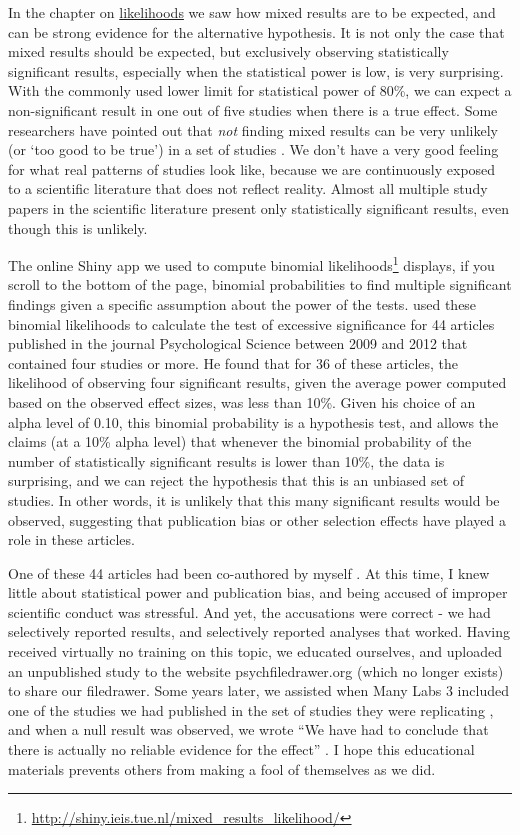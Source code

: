 \documentclass[
  oneside]{krantz}
\renewcommand{\href}[2]{#2\footnote{\url{#1}}}
\begin{document}
In the chapter on \protect\hyperlink{likelihoods}{likelihoods} we saw how mixed results are to be expected, and can be strong evidence for the alternative hypothesis. It is not only the case that mixed results should be expected, but exclusively observing statistically significant results, especially when the statistical power is low, is very surprising. With the commonly used lower limit for statistical power of 80\%, we can expect a non-significant result in one out of five studies when there is a true effect. Some researchers have pointed out that \emph{not} finding mixed results can be very unlikely (or `too good to be true') in a set of studies \citep{francis_frequency_2014, schimmack_ironic_2012}. We don't have a very good feeling for what real patterns of studies look like, because we are continuously exposed to a scientific literature that does not reflect reality. Almost all multiple study papers in the scientific literature present only statistically significant results, even though this is unlikely.

The \href{http://shiny.ieis.tue.nl/mixed_results_likelihood/}{online Shiny app we used to compute binomial likelihoods} displays, if you scroll to the bottom of the page, binomial probabilities to find multiple significant findings given a specific assumption about the power of the tests. \citet{francis_frequency_2014} used these binomial likelihoods to calculate the test of excessive significance \citep{ioannidis_exploratory_2007} for 44 articles published in the journal Psychological Science between 2009 and 2012 that contained four studies or more. He found that for 36 of these articles, the likelihood of observing four significant results, given the average power computed based on the observed effect sizes, was less than 10\%. Given his choice of an alpha level of 0.10, this binomial probability is a hypothesis test, and allows the claims (at a 10\% alpha level) that whenever the binomial probability of the number of statistically significant results is lower than 10\%, the data is surprising, and we can reject the hypothesis that this is an unbiased set of studies. In other words, it is unlikely that this many significant results would be observed, suggesting that publication bias or other selection effects have played a role in these articles.

One of these 44 articles had been co-authored by myself \citep{jostmann_weight_2009}. At this time, I knew little about statistical power and publication bias, and being accused of improper scientific conduct was stressful. And yet, the accusations were correct - we had selectively reported results, and selectively reported analyses that worked. Having received virtually no training on this topic, we educated ourselves, and uploaded an unpublished study to the website psychfiledrawer.org (which no longer exists) to share our filedrawer. Some years later, we assisted when Many Labs 3 included one of the studies we had published in the set of studies they were replicating \citep{ebersole_many_2016}, and when a null result was observed, we wrote ``We have had to conclude that there is actually no reliable evidence for the effect'' \citep{jostmann_short_2016}. I hope this educational materials prevents others from making a fool of themselves as we did.
\end{document}
